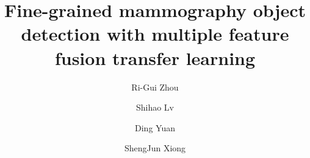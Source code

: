 \title{Fine-grained mammography object 
detection with multiple feature fusion 
transfer learning}

\author[add1,add2]{Ri-Gui Zhou}

\author[add1,add2]{Shihao Lv}

\author[add3]{Ding Yuan}

\author[add3]{ShengJun Xiong}


\address[add1]{College of Information 
Engineering, Shanghai Maritime University, 
Shanghai 201306, China}
\address[add2]{Research Center of 
Intelligent Information Processing and 
Quantum Intelligent Computing, Shanghai 
201306, China}
\address[add3]{HT-NOVA Co. Ltd,
Building 39, Yard 12, 
Tianzhu Comprehensive Bonded Zone, 
Shunyi District, Beijing, 101318, China}